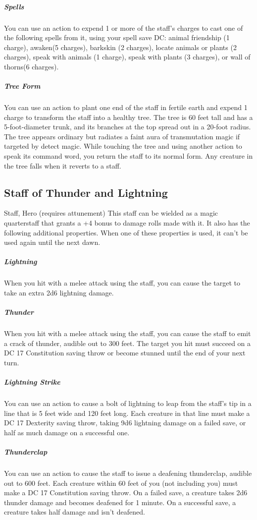 \subparagraph*{Spells} You can use an action to expend 1 or more of the staff's charges to cast one of the following spells from it, using your spell save DC: animal friendship (1 charge), awaken(5 charges), barkskin (2 charges), locate animals or plants (2 charges), speak with animals (1 charge), speak with plants (3 charges), or wall of thorns(6 charges).

\subparagraph*{Tree Form} You can use an action to plant one end of the staff in fertile earth and expend 1 charge to transform the staff into a healthy tree. The tree is 60 feet tall and has a 5-foot-diameter trunk, and its branches at the top spread out in a 20-foot radius. The tree appears ordinary but radiates a faint aura of transmutation magic if targeted by detect magic. While touching the tree and using another action to speak its command word, you return the staff to its normal form. Any creature in the tree falls when it reverts to a staff.

\subsection{Staff of Thunder and Lightning}
Staff, Hero (requires attunement)
This staff can be wielded as a magic quarterstaff that grants a +4 bonus to damage rolls made with it. It also has the following additional properties. When one of these properties is used, it can't be used again until the next dawn.

\subparagraph*{Lightning} When you hit with a melee attack using the staff, you can cause the target to take an extra 2d6 lightning damage.

\subparagraph*{Thunder} When you hit with a melee attack using the staff, you can cause the staff to emit a crack of thunder, audible out to 300 feet. The target you hit must succeed on a DC 17 Constitution saving throw or become stunned until the end of your next turn.

\subparagraph*{Lightning Strike} You can use an action to cause a bolt of lightning to leap from the staff's tip in a line that is 5 feet wide and 120 feet long. Each creature in that line must make a DC 17 Dexterity saving throw, taking 9d6 lightning damage on a failed save, or half as much damage on a successful one.

\subparagraph*{Thunderclap} You can use an action to cause the staff to issue a deafening thunderclap, audible out to 600 feet. Each creature within 60 feet of you (not including you) must make a DC 17 Constitution saving throw. On a failed save, a creature takes 2d6 thunder damage and becomes deafened for 1 minute. On a successful save, a creature takes half damage and isn't deafened.

